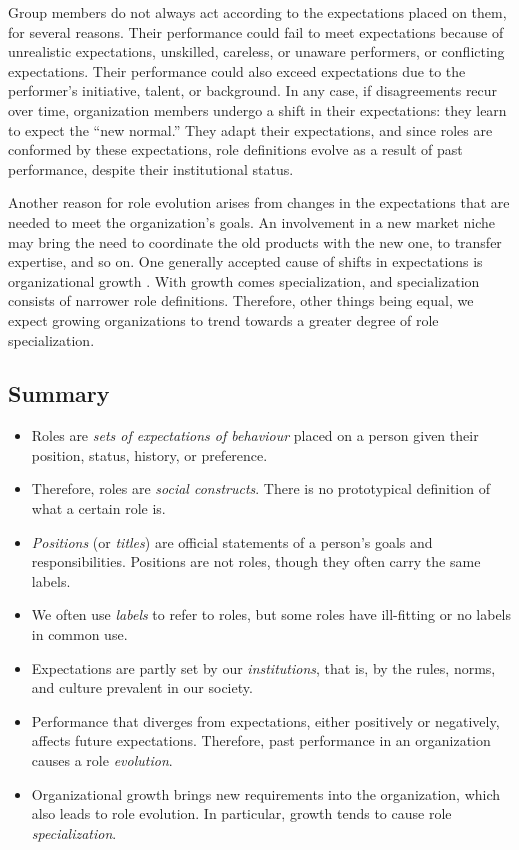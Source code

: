 \documentclass[10pt, conference, compsocconf]{IEEEtran}
\begin{document}
Group members do not always act according to the expectations placed on them, for several reasons. Their performance could fail to meet expectations because of unrealistic expectations, unskilled, careless, or unaware performers, or conflicting expectations. Their performance could also exceed expectations due to the performer's initiative, talent, or background. In any case, if disagreements recur over time, organization members undergo a shift in their expectations: they learn to expect the ``new normal.'' They adapt their expectations, and since roles are conformed by these expectations, role definitions evolve as a result of past performance, despite their institutional status.

Another reason for role evolution arises from changes in the expectations that are needed to meet the organization's goals. An involvement in a new market niche may bring the need to coordinate the old products with the new one, to transfer expertise, and so on. One generally accepted cause of shifts in expectations is organizational growth \cite{Blau1971,Haveman1993}. With growth comes specialization, and specialization consists of narrower role definitions. Therefore, other things being equal, we expect growing organizations to trend towards a greater degree of role specialization.


\subsection{Summary}

\begin{itemize}
\item Roles are \emph{sets of expectations of behaviour} placed on a person given their position, status, history, or preference.

\item Therefore, roles are \emph{social constructs}. There is no prototypical definition of what a certain role is.

\item \emph{Positions} (or \emph{titles}) are official statements of a person's goals and responsibilities. Positions are not roles, though they often carry the same labels.

\item We often use \emph{labels} to refer to roles, but some roles have ill-fitting or no labels in common use.

\item Expectations are partly set by our \emph{institutions}, that is, by the rules, norms, and culture prevalent in our society.

\item Performance that diverges from expectations, either positively or negatively, affects future expectations. Therefore, past performance in an organization causes a role \emph{evolution}.

\item Organizational growth brings new requirements into the organization, which also leads to role evolution. In particular, growth tends to cause role \emph{specialization}.
\end{itemize}
\end{document}
